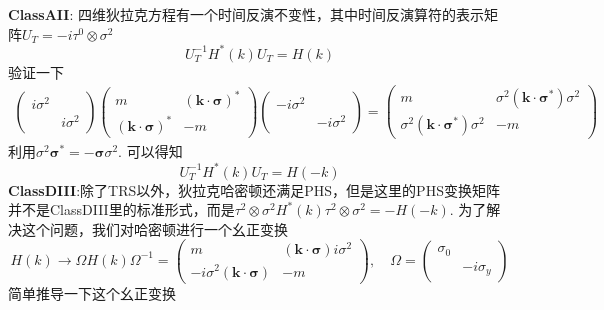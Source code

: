 \documentclass{article}
\numberwithin{equation}{subsection}
\begin{document}
\textbf{ClassAII}: 四维狄拉克方程有一个时间反演不变性，其中时间反演算符的表示矩阵$U_T=-i\tau^0\otimes\sigma^2$
\begin{equation}
    U_T^{-1}H^*(k)U_T=H(k)
\end{equation}
验证一下
\begin{equation*}
    \begin{split}
        \begin{pmatrix}i\sigma^2&\\
        &i\sigma^2\end{pmatrix}\begin{pmatrix}
            m&(\bm{k}\cdot\bm{\sigma})^*\\
            (\bm{k}\cdot\bm{\sigma})^*&-m
        \end{pmatrix}\begin{pmatrix}
            -i\sigma^2&\\
            &-i\sigma^2
        \end{pmatrix}=\begin{pmatrix}
            m&\sigma^2(\bm{k}\cdot\bm{\sigma}^*)\sigma^2\\
            \sigma^2(\bm{k}\cdot\bm{\sigma}^*)\sigma^2&-m
        \end{pmatrix}
    \end{split}
\end{equation*}
利用$\sigma^2\bm{\sigma}^*=-\bm{\sigma}\sigma^2$. 可以得知
\begin{equation*}
    U_T^{-1}H^*(k)U_T=H(-k)
\end{equation*}
\textbf{ClassDIII}:除了TRS以外，狄拉克哈密顿还满足PHS，但是这里的PHS变换矩阵并不是ClassDIII里的标准形式，而是$\tau^2\otimes\sigma^2H^*(k)\tau^2\otimes\sigma^2=-H(-k)$. 为了解决这个问题，我们对哈密顿进行一个幺正变换
\begin{equation}
    H(k)\rightarrow\Omega H(k)\Omega^{-1}=\begin{pmatrix}
        m&(\bm{k}\cdot\bm{\sigma})i\sigma^2\\
        -i\sigma^2(\bm{k}\cdot\bm{\sigma})&-m
    \end{pmatrix},\quad \Omega=\begin{pmatrix}
        \sigma_0&\\
        &-i\sigma_y
    \end{pmatrix}
\end{equation}
简单推导一下这个幺正变换
\end{document}

